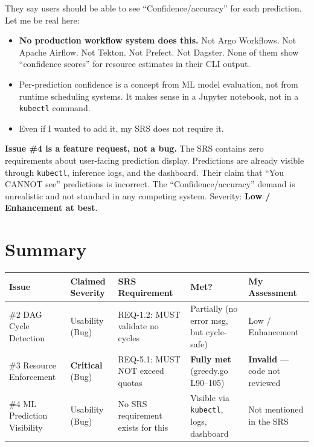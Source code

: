 \documentclass[12pt,a4paper]{article}
\begin{document}
They say users should be able to see ``Confidence/accuracy'' for each prediction. Let me be real here:

\begin{itemize}
  \item \textbf{No production workflow system does this.} Not Argo Workflows. Not Apache Airflow. Not Tekton. Not Prefect. Not Dagster. None of them show ``confidence scores'' for resource estimates in their CLI output.
  \item Per-prediction confidence is a concept from ML model evaluation, not from runtime scheduling systems. It makes sense in a Jupyter notebook, not in a \texttt{kubectl} command.
  \item Even if I wanted to add it, my SRS does not require it.
\end{itemize}

\begin{verdictbox}
\textbf{Issue \#4 is a feature request, not a bug.} The SRS contains zero requirements about user-facing prediction display. Predictions are already visible through \texttt{kubectl}, inference logs, and the dashboard. Their claim that ``You CANNOT see'' predictions is incorrect. The ``Confidence/accuracy'' demand is unrealistic and not standard in any competing system. Severity: \textbf{Low / Enhancement at best}.
\end{verdictbox}

\newpage

\section{Summary}

\begin{longtable}{|p{2.2cm}|p{2cm}|p{3.5cm}|p{2.2cm}|p{3cm}|}
\hline
\textbf{Issue} & \textbf{Claimed Severity} & \textbf{SRS Requirement} & \textbf{Met?} & \textbf{My Assessment} \\
\hline
\#2 DAG Cycle Detection & Usability (Bug) & REQ-1.2: MUST validate no cycles & Partially (no error msg, but cycle-safe) & Low / Enhancement \\
\hline
\#3 Resource Enforcement & \textbf{Critical} (Bug) & REQ-5.1: MUST NOT exceed quotas & \textbf{Fully met} (greedy.go L90--105) & \textbf{Invalid} --- code not reviewed \\
\hline
\#4 ML Prediction Visibility & Usability (Bug) & No SRS requirement exists for this & Visible via \texttt{kubectl}, logs, dashboard & Not mentioned in the SRS \\
\hline
\end{longtable}
\end{document}
